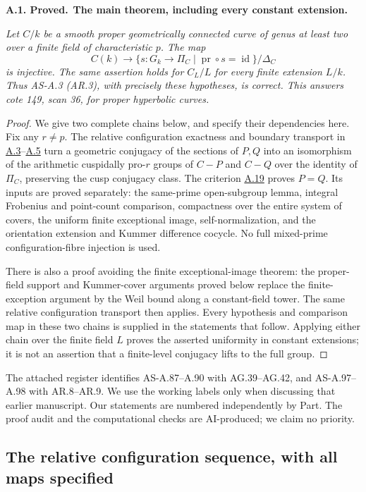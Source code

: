 \documentclass[11pt,a4paper]{article}
\newenvironment{claim}[3]{\par\medskip\noindent\hypertarget{#1}{\textbf{#1. #2.}}\ \textbf{#3.}\par\nopagebreak\smallskip\begingroup\itshape}{\endgroup\par\smallskip}
\newcommand{\statementref}[1]{\hyperlink{#1}{#1}}
\begin{document}
\begin{claim}{A.1}{Proved}{The main theorem, including every constant extension}
Let $C/k$ be a smooth proper geometrically connected curve of genus at
least two over a finite field of characteristic $p$. The map
\[
 C(k)\longrightarrow
 \{s:G_k\to\Pi_C\mid \operatorname{pr}\circ s=\operatorname{id}\}/\Delta_C
\]
is injective. The same assertion holds for $C_L/L$ for every finite
extension $L/k$. Thus AS-A.3 (AR.3), with precisely these hypotheses,
is correct. This answers cote 149, scan 36, for proper hyperbolic curves.
\end{claim}
\begin{proof}
We give two complete chains below, and specify their dependencies here.
Fix any $r\ne p$. The relative configuration exactness and boundary
transport in \statementref{A.3}--\statementref{A.5}
turn a geometric conjugacy of the sections of $P,Q$ into an isomorphism
of the arithmetic cuspidally pro-$r$ groups of $C-P$ and $C-Q$ over the
identity of $\Pi_C$, preserving the cusp conjugacy class. The criterion
\statementref{A.19} proves $P=Q$. Its inputs are proved separately:
the same-prime open-subgroup lemma, integral Frobenius and point-count
comparison, compactness over the entire system of covers, the uniform
finite exceptional image, self-normalization, and the orientation
extension and Kummer difference cocycle. No full mixed-prime
configuration-fibre injection is used.

There is also a proof avoiding the finite exceptional-image theorem:
the proper-field support and Kummer-cover arguments proved below
replace the finite-exception argument by the Weil bound along a
constant-field tower. The same relative configuration transport then
applies. Every hypothesis and comparison map in these two chains is
supplied in the statements that follow. Applying either chain over the
finite field $L$ proves the asserted uniformity in constant extensions;
it is not an assertion that a finite-level conjugacy lifts to the full group.
\end{proof}

The attached register identifies AS-A.87--A.90 with AG.39--AG.42,
and AS-A.97--A.98 with AR.8--AR.9. We use the working labels only
when discussing that earlier manuscript. Our statements are numbered
independently by Part. The proof audit and the computational checks
are AI-produced; we claim no priority.



\subsection{The relative configuration sequence, with all maps specified}
\end{document}
